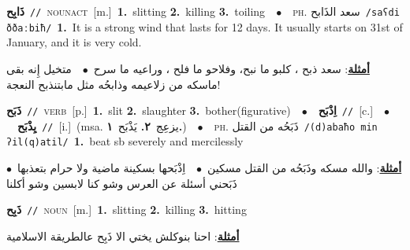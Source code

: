 \documentclass[10pt,a4paper,twoside]{article} %
\begin{document}
\begin{multicols}{2}
{\setlength\topsep{0pt}\textbf{\foreignlanguage{arabic}{ذَابِح}}\ {\color{gray}\texttt{//}\color{black}}\ \textsc{noun\textunderscore act}\ [m.]\ \textbf{1.}~slitting  \textbf{2.}~killing  \textbf{3.}~toiling\ \ $\bullet$\ \ \textsc{ph.} \color{gray} \foreignlanguage{arabic}{سعد الذَابح}\color{black}\ {\color{gray}\texttt{/{\sffamily saʕdi ððaːbiħ}/}\color{black}}\ \textbf{1.}~It is a strong wind that lasts for 12 days. It usually starts on 31st of January, and it is very cold.\  \begin{flushright}\color{gray}\foreignlanguage{arabic}{\textbf{\underline{\foreignlanguage{arabic}{أمثلة}}}: سعد ذبح ، كلبو ما نبح، وفلاحو ما فلح ، وراعيه ما سرح\ $\bullet$\ \  متخيل إِنه بقى ماسكه من زلاعيمه وذابحُه مثل مابتنذبح النعجة!}\end{flushright}\color{black}} \vspace{2mm}

{\setlength\topsep{0pt}\textbf{\foreignlanguage{arabic}{ذَبَح}}\ {\color{gray}\texttt{//}\color{black}}\ \textsc{verb}\ [p.]\ \textbf{1.}~slit  \textbf{2.}~slaughter  \textbf{3.}~bother(figurative)\ \ $\bullet$\ \ \setlength\topsep{0pt}\textbf{\foreignlanguage{arabic}{اِذْبَح}}\ {\color{gray}\texttt{//}\color{black}}\ [c.]\ \ $\bullet$\ \ \setlength\topsep{0pt}\textbf{\foreignlanguage{arabic}{يِذْبَح}}\ {\color{gray}\texttt{//}\color{black}}\ [i.]\ \color{gray}(msa. \foreignlanguage{arabic}{يزعِج}~\foreignlanguage{arabic}{\textbf{٢.}}  \foreignlanguage{arabic}{يَذْبَح}~\foreignlanguage{arabic}{\textbf{١.}})\color{black}\ \ $\bullet$\ \ \textsc{ph.} \color{gray} \foreignlanguage{arabic}{ذَبَحُه من القتل}\color{black}\ {\color{gray}\texttt{/{\sffamily (d)abaħo min ʔil(q)atil}/}\color{black}}\ \textbf{1.}~beat sb severely and mercilessly\  \begin{flushright}\color{gray}\foreignlanguage{arabic}{\textbf{\underline{\foreignlanguage{arabic}{أمثلة}}}: والله مسكه وذَبَحُه من القتل مسكين\ $\bullet$\ \  اِذْبَحها بسكينة ماضية ولا حرام بتعذبها\ $\bullet$\ \  ذَبَحني أسئلة عن العرس وشو كنا لابسين وشو أكلنا}\end{flushright}\color{black}} \vspace{2mm}

{\setlength\topsep{0pt}\textbf{\foreignlanguage{arabic}{ذَبِح}}\ {\color{gray}\texttt{//}\color{black}}\ \textsc{noun}\ [m.]\ \textbf{1.}~slitting  \textbf{2.}~killing  \textbf{3.}~hitting\  \begin{flushright}\color{gray}\foreignlanguage{arabic}{\textbf{\underline{\foreignlanguage{arabic}{أمثلة}}}: احنا بنوكلش يختي الا ذَبِح عالطريقة الاسلامية}\end{flushright}\color{black}} \vspace{2mm}


\end{multicols}
\end{document}
